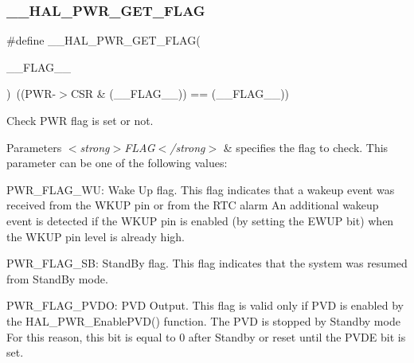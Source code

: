 \mbox{\label{group___p_w_r___exported___macros_ga2977135bbea35b786805eea640d1c884}} 
\subsubsection{\texorpdfstring{\+\_\+\+\_\+\+H\+A\+L\+\_\+\+P\+W\+R\+\_\+\+G\+E\+T\+\_\+\+F\+L\+AG}{\_\_HAL\_PWR\_GET\_FLAG}}
{\footnotesize\ttfamily \#define \+\_\+\+\_\+\+H\+A\+L\+\_\+\+P\+W\+R\+\_\+\+G\+E\+T\+\_\+\+F\+L\+AG(\begin{DoxyParamCaption}\item[{}]{\+\_\+\+\_\+\+F\+L\+A\+G\+\_\+\+\_\+ }\end{DoxyParamCaption})~((P\+WR-\/$>$C\+SR \& (\+\_\+\+\_\+\+F\+L\+A\+G\+\_\+\+\_\+)) == (\+\_\+\+\_\+\+F\+L\+A\+G\+\_\+\+\_\+))}



Check P\+WR flag is set or not. 


\begin{DoxyParams}{Parameters}
{\em $<$strong$>$\+F\+L\+A\+G$<$/strong$>$} & specifies the flag to check. This parameter can be one of the following values\+: \begin{DoxyItemize}
\item P\+W\+R\+\_\+\+F\+L\+A\+G\+\_\+\+WU\+: Wake Up flag. This flag indicates that a wakeup event was received from the W\+K\+UP pin or from the R\+TC alarm An additional wakeup event is detected if the W\+K\+UP pin is enabled (by setting the E\+W\+UP bit) when the W\+K\+UP pin level is already high. \item P\+W\+R\+\_\+\+F\+L\+A\+G\+\_\+\+SB\+: Stand\+By flag. This flag indicates that the system was resumed from Stand\+By mode. \item P\+W\+R\+\_\+\+F\+L\+A\+G\+\_\+\+P\+V\+DO\+: P\+VD Output. This flag is valid only if P\+VD is enabled by the H\+A\+L\+\_\+\+P\+W\+R\+\_\+\+Enable\+P\+V\+D() function. The P\+VD is stopped by Standby mode For this reason, this bit is equal to 0 after Standby or reset until the P\+V\+DE bit is set. \end{DoxyItemize}
\\
\hline
\end{DoxyParams}

